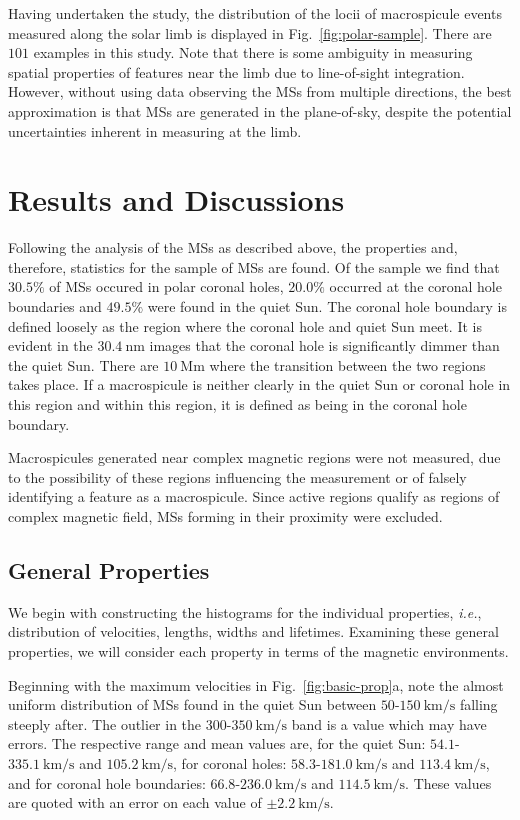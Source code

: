 Having undertaken the study, the distribution of the locii of macrospicule events measured along the solar limb is displayed in Fig.~\ref{fig:polar-sample}. There are $101$ examples in this study. Note that there is some ambiguity in measuring spatial properties of features near the limb due to line-of-sight integration. However, without using data observing the MSs from multiple directions, the best approximation is that MSs are generated in the plane-of-sky, despite the potential uncertainties inherent in measuring at the limb.



\section{Results and Discussions}
\label{sec:RandD1}
Following the analysis of the MSs as described above, the properties and, therefore, statistics for the sample of MSs are found. Of the sample we find that $30.5\%$ of MSs occured in polar coronal holes, $20.0\%$ occurred at the coronal hole boundaries and $49.5\%$ were found in the quiet Sun. The coronal hole boundary is defined loosely as the region where the coronal hole and quiet Sun meet. It is evident in the $30.4\ \textrm{nm}$ images that the coronal hole is significantly dimmer than the quiet Sun. There are $10\ \textrm{Mm}$ where the transition between the two regions takes place. If a macrospicule is neither clearly in the quiet Sun or coronal hole in this region and within this region, it is defined as being in the coronal hole boundary.

Macrospicules generated near complex magnetic regions were not measured, due to the possibility of these regions influencing the measurement or of falsely identifying a feature as a macrospicule. Since active regions qualify as regions of complex magnetic field, MSs forming in their proximity were excluded.


\subsection{General Properties}
We begin with constructing the histograms for the individual properties, \emph{i.e.}, distribution of velocities, lengths, widths and lifetimes. Examining these general properties, we will consider each property in terms of the magnetic environments.

Beginning with the maximum velocities in Fig.~\ref{fig:basic-prop}a, note the almost uniform distribution of MSs found in the quiet Sun between $50$-$150\ \textrm{km/s}$ falling steeply after. The outlier in the $300$-$350\ \textrm{km/s}$ band is a value which may have errors. The respective range and mean values are, for the quiet Sun: $54.1$-$335.1\ \textrm{km/s}$ and $105.2\ \textrm{km/s}$, for coronal holes: $58.3$-$181.0\ \textrm{km/s}$ and $113.4\ \textrm{km/s}$, and for coronal hole boundaries: $66.8$-$236.0\ \textrm{km/s}$ and $114.5\ \textrm{km/s}$. These values are quoted with an error on each value of $\pm2.2\ \textrm{km/s}$.


